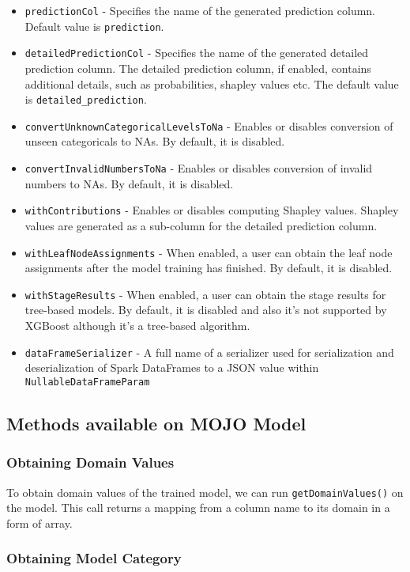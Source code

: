 \begin{itemize}
    \item \texttt{predictionCol} - Specifies the name of the generated prediction column. Default value is \texttt{prediction}.
    \item \texttt{detailedPredictionCol} - Specifies the name of the generated detailed prediction column. The detailed prediction column, if enabled, contains additional details, such as probabilities, shapley values etc. The default value is \texttt{detailed\_prediction}.
    \item \texttt{convertUnknownCategoricalLevelsToNa} - Enables or disables conversion of unseen categoricals to NAs. By default, it is disabled.
    \item \texttt{convertInvalidNumbersToNa} - Enables or disables conversion of invalid numbers to NAs. By default, it is disabled.
    \item \texttt{withContributions} - Enables or disables computing Shapley values. Shapley values are generated as a sub-column for the detailed prediction column.
    \item \texttt{withLeafNodeAssignments} - When enabled, a user can obtain the leaf node assignments after the model training has finished. By default, it is disabled.
    \item \texttt{withStageResults} - When enabled, a user can obtain the stage results for tree-based models. By default, it is disabled and also it's not supported by XGBoost although it's a tree-based algorithm.
    \item \texttt{dataFrameSerializer} - A full name of a serializer used for serialization and deserialization of Spark DataFrames to a JSON value within \texttt{NullableDataFrameParam}
\end{itemize}

\subsection{Methods available on MOJO Model}

\subsubsection{Obtaining Domain Values}

To obtain domain values of the trained model, we can run \texttt{getDomainValues()} on the model. This call
returns a mapping from a column name to its domain in a form of array.

\subsubsection{Obtaining Model Category}

